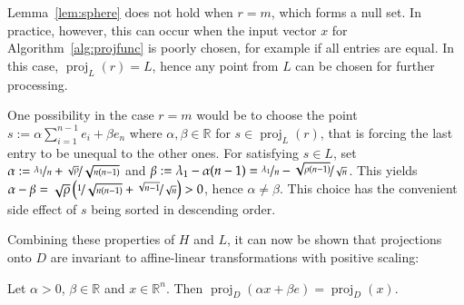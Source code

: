 \documentclass[twoside,11pt]{article}
\DeclareMathOperator{\proj}{proj}
\newcommand{\R}{\mathbb{R}}
\newcommand{\0}{\mathcal{O}}
\begin{document}
Lemma~\ref{lem:sphere} does not hold when $r = m$, which forms a null set.
In practice, however, this can occur when the input vector $x$ for Algorithm~\ref{alg:projfunc} is poorly chosen, for example if all entries are equal.
In this case, $\proj_L(r) = L$, hence any point from $L$ can be chosen for further processing.
\begin{remark}
\label{rem:projmontoL}
One possibility in the case $r = m$ would be to choose the point $s := \alpha\sum_{i = 1}^{n-1}e_i + \beta e_n$ where $\alpha,\beta\in\R$ for $s\in\proj_L(r)$, that is forcing the last entry to be unequal to the other ones.
For satisfying $s\in L$, set $\alpha := \nicefrac{\lambda_1}{n} + \nicefrac{\sqrt{\rho}}{\sqrt{n(n-1)}}$ and $\beta := \lambda_1 - \alpha(n-1) = \nicefrac{\lambda_1}{n} - \nicefrac{\sqrt{\rho(n-1)}}{\sqrt{n}}$.
This yields $\alpha - \beta = \sqrt{\rho}\left(\nicefrac{1}{\sqrt{n(n-1)}} + \nicefrac{\sqrt{n-1}}{\sqrt{n}}\right) > 0$, hence $\alpha\neq \beta$.
This choice has the convenient side effect of $s$ being sorted in descending order.
\end{remark}
Combining these properties of $H$ and $L$, it can now be shown that projections onto $D$ are invariant to affine-linear transformations with positive scaling:
\begin{corollary}
\label{cor:affine_invariance_projection}
Let $\alpha > 0$, $\beta\in\R$ and $x\in\R^n$.
Then $\proj_D(\alpha x + \beta e) = \proj_D(x)$.
\end{corollary}
\end{document}
